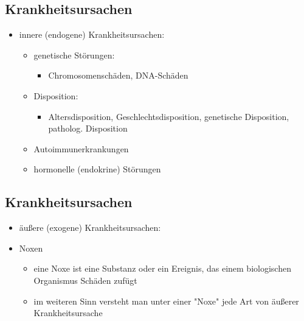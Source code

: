 \subsection{Krankheitsursachen}
	\begin{itemize}
		\item innere (endogene) Krankheitsursachen:
			\begin{itemize}
				\item genetische Störungen:
					\begin{itemize}
						\item Chromosomenschäden, DNA-Schäden
					\end{itemize}
				\item Disposition:
					\begin{itemize}
						\item Altersdisposition, Geschlechtsdisposition, genetische Disposition, patholog. Disposition
					\end{itemize}
				\item Autoimmunerkrankungen
				\item hormonelle (endokrine) Störungen
			\end{itemize}
	\end{itemize}

\subsection{Krankheitsursachen}
	\begin{itemize}
		\item äußere (exogene) Krankheitsursachen:
		\item Noxen
			\begin{itemize}
				\item eine Noxe ist eine Substanz oder ein Ereignis, das einem biologischen Organismus Schäden zufügt
				\item im weiteren Sinn versteht man unter einer "Noxe" jede Art von äußerer Krankheitsursache
			\end{itemize}
	\end{itemize}

